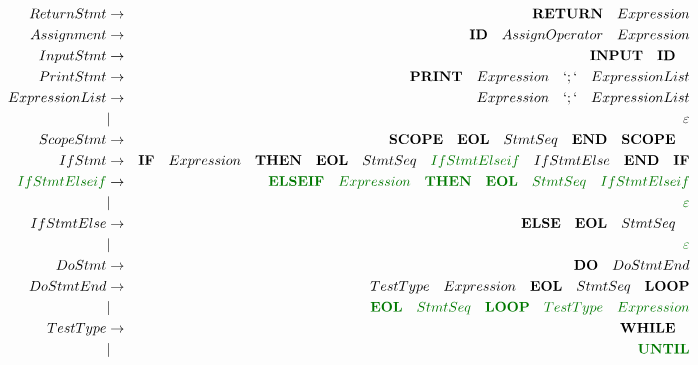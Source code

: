 \documentclass[a4paper,11pt,landscape,leqno]{article}
\begin{document}
\begin{eqnarray}
ReturnStmt	&	\rightarrow		& \textbf{RETURN}\quad Expression	  \\
Assignment	& \rightarrow		& \textbf{ID}\quad AssignOperator \quad Expression \\
InputStmt	&	 \rightarrow	& \textbf{INPUT}\quad \textbf{ID}\quad	 \\
PrintStmt	&	 \rightarrow	& \textbf{PRINT}\quad Expression\quad `;` \quad ExpressionList\\
ExpressionList&  \rightarrow	&  Expression\quad `;`\quad ExpressionList\\
			&	 |				& \varepsilon	\\
ScopeStmt	&	 \rightarrow	&	\textbf{SCOPE}\quad   \textbf{EOL} \quad StmtSeq\quad	 \textbf{END}\quad \textbf{SCOPE}\quad	  \\
IfStmt	&\rightarrow& \textbf{IF} \quad Expression \quad \textbf{THEN}\quad \textbf{EOL}\quad StmtSeq \quad \textcolor{green1}{IfStmtElseif}\quad IfStmtElse\quad \textbf{END}\quad \textbf{IF}	\\
\textcolor{green1}{IfStmtElseif}&\rightarrow &\textcolor{green1}{\textbf{ELSEIF}\quad Expression\quad \textbf{THEN}\quad \textbf{EOL}\quad StmtSeq \quad IfStmtElseif}	 \\
&	|	&\textcolor{green1}{\varepsilon}  \\
IfStmtElse&   \rightarrow &\textbf{ELSE}\quad  \textbf{EOL}\quad StmtSeq\quad  \\
&	|	&\textcolor{green1}{\varepsilon}  \\
DoStmt&    \rightarrow	  & \textbf{DO} \quad DoStmtEnd   \\
DoStmtEnd&	 \rightarrow  &  TestType \quad  Expression \quad \textbf{EOL} \quad StmtSeq \quad \textbf{LOOP}	\\
&	 | &\textcolor{green1}{\textbf{EOL} \quad StmtSeq \quad \textbf{LOOP}\quad TestType \quad  Expression} \\
TestType & \rightarrow	&	\textbf{WHILE}\quad \\
		&		|		& \textcolor{green1}{\textbf{UNTIL}} \\

\end{eqnarray}
\end{document}
